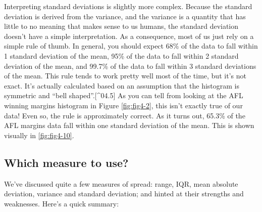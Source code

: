 \documentclass[
]{book}
\begin{document}
Interpreting standard deviations is slightly more complex. Because the standard deviation is derived from the variance, and the variance is a quantity that has little to no meaning that makes sense to us humans, the standard deviation doesn't have a simple interpretation. As a consequence, most of us just rely on a simple rule of thumb. In general, you should expect 68\% of the data to fall within 1 standard deviation of the mean, 95\% of the data to fall within 2 standard deviation of the mean, and 99.7\% of the data to fall within 3 standard deviations of the mean. This rule tends to work pretty well most of the time, but it's not exact. It's actually calculated based on an assumption that the histogram is symmetric and ``bell shaped''.{[}\^{}04.5{]} As you can tell from looking at the AFL winning margins histogram in Figure \ref{fig:fig4-2}, this isn't exactly true of our data! Even so, the rule is approximately correct. As it turns out, 65.3\% of the AFL margins data fall within one standard deviation of the mean. This is shown visually in \ref{fig:fig4-10}.

\hypertarget{which-measure-to-use}{%
\subsection{Which measure to use?}\label{which-measure-to-use}}

We've discussed quite a few measures of spread: range, IQR, mean absolute deviation, variance and standard deviation; and hinted at their strengths and weaknesses. Here's a quick summary:
\end{document}
